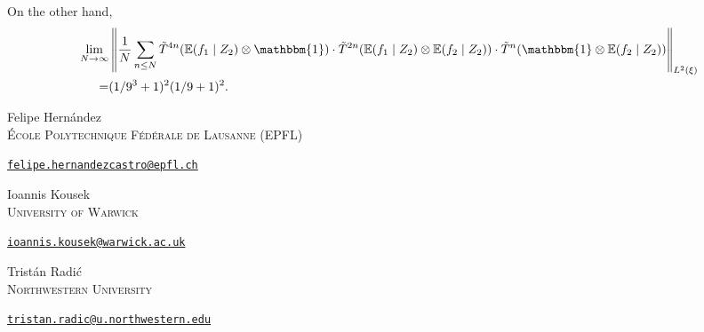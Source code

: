 \documentclass[letter, 11pt]{article}
\theoremstyle{definition}
\theoremstyle{plain}
\newcommand{\norm}[1]{\left\lVert#1\right\rVert}
\providecommand{\norm}[1]{\lVert #1\rVert}
\newcommand{\1}{\mathbbm{1}}
\newcommand{\E}{\operatorname{\mathbb{E}}}
\begin{document}
On the other hand, 
\begin{align*}
    \lim_{N \to \infty}& \norm{\frac{1}{N} \sum_{n \leq N} \tilde T^{4n} (\E( f_1\mid Z_2)\otimes \1) \cdot \tilde T^{2n} (\E( f_1 \mid Z_2) \otimes \E(f_2 \mid Z_2)) \cdot \tilde T^{n} ( \1 \otimes \E(f_2 \mid Z_2))  }_{L^2(\xi)} \\=& (1/9^3  +1)^2 (1/9 +1)^2.
\end{align*}


\small{



}
\bigskip
\noindent
Felipe Hernández\\
\textsc{{\'E}cole Polytechnique F{\'e}d{\'e}rale de Lausanne} (EPFL)\par\nopagebreak
\noindent
\href{mailto:felipe.hernandezcastro@epfl.ch}
{\texttt{felipe.hernandezcastro@epfl.ch}}

\bigskip
\noindent
Ioannis Kousek\\
\textsc{University of Warwick} \par\nopagebreak
\noindent
\href{mailto: ioannis.kousek@warwick.ac.uk}
{\texttt{ioannis.kousek@warwick.ac.uk}}

\bigskip
\noindent
Tristán Radić\\
\textsc{Northwestern University} \par\nopagebreak
\noindent
\href{mailto:tristan.radic@u.northwestern.edu}
{\texttt{tristan.radic@u.northwestern.edu}}
\end{document}

